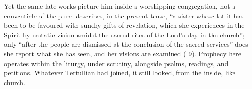 Yet the same late works picture him inside a worshipping congregation, not a
conventicle of the pure.  describes, in the present tense,
``a sister whose lot it has been to be favoured with sundry gifts of
revelation, which she experiences in the Spirit by ecstatic vision amidst the
sacred rites of the Lord's day in the church''; only ``after the people are
dismissed at the conclusion of the sacred services'' does she report what she
has seen, and her visions are examined ( 9). Prophecy here
operates within the liturgy, under scrutiny, alongside psalms, readings, and
petitions. Whatever Tertullian had joined, it still looked, from the inside,
like church.
